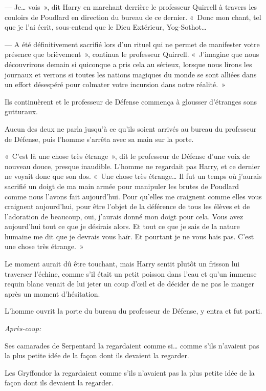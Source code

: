 --- Je… vois~», dit Harry en marchant derrière le professeur Quirrell à travers les couloirs de Poudlard en direction du bureau de ce dernier. «~Donc mon chant, tel que je l'ai écrit, sous-entend que le Dieu Extérieur, Yog-Sothot…

--- A été définitivement sacrifié lors d'un rituel qui ne permet de manifester votre présence que brièvement~», continua le professeur Quirrell. «~J'imagine que nous découvrirons demain si quiconque a pris cela au sérieux, lorsque nous lirons les journaux et verrons si toutes les nations magiques du monde se sont alliées dans un effort désespéré pour colmater votre incursion dans notre réalité.~»

Ils continuèrent et le professeur de Défense commença à glousser d'étranges sons gutturaux.

Aucun des deux ne parla jusqu'à ce qu'ils soient arrivés au bureau du professeur de Défense, puis l'homme s'arrêta avec sa main sur la porte.

«~C'est là une chose très étrange~», dit le professeur de Défense d'une voix de nouveau douce, presque inaudible. L'homme ne regardait pas Harry, et ce dernier ne voyait donc que son dos. «~Une chose très étrange… Il fut un temps où j'aurais sacrifié un doigt de ma main armée pour manipuler les brutes de Poudlard comme nous l'avons fait aujourd'hui. Pour qu'elles me craignent comme elles vous craignent aujourd'hui, pour être l'objet de la déférence de tous les élèves et de l'adoration de beaucoup, oui, j'aurais donné mon doigt pour cela. Vous avez aujourd'hui tout ce que je désirais alors. Et tout ce que je sais de la nature humaine me dit que je devrais vous haïr. Et pourtant je ne vous hais pas. C'est une chose très étrange.~»

Le moment aurait dû être touchant, mais Harry sentit plutôt un frisson lui traverser l'échine, comme s'il était un petit poisson dans l'eau et qu'un immense requin blanc venait de lui jeter un coup d'œil et de décider de ne pas le manger après un moment d'hésitation.

L'homme ouvrit la porte du bureau du professeur de Défense, y entra et fut parti.

\later

\emph{Après-coup:}

Ses camarades de Serpentard la regardaient comme si… comme s'ils n'avaient pas la plus petite idée de la façon dont ils devaient la regarder.

Les Gryffondor la regardaient comme s'ils n'avaient pas la plus petite idée de la façon dont ils devaient la regarder.

